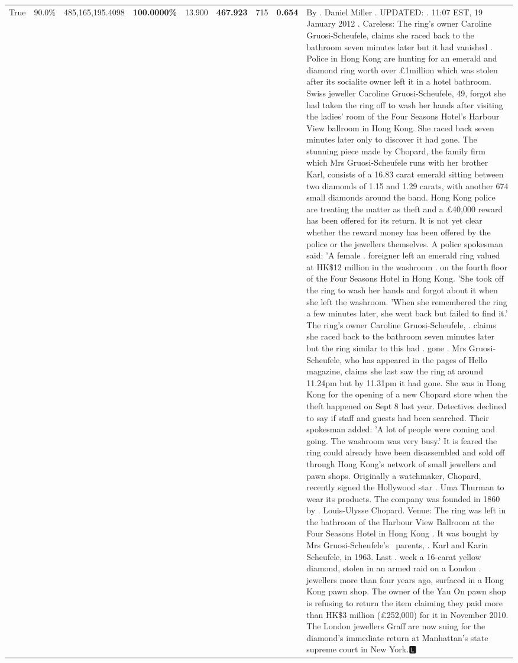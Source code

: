 \begin{table}[H]
\begin{tabular}{lllrlllll}
\cline{1-9}
True & 90.0\% & 485,165,195.4098 & \bfseries \color{red} 100.0000\% & 13.900 & \bfseries \color{red} 467.923 & 715 & \bfseries \color{red} 0.654 & By . Daniel Miller . UPDATED: . 11:07 EST, 19 January 2012 . Careless: The ring's owner Caroline Gruosi-Scheufele, claims she raced back to the bathroom seven minutes later but it had vanished . Police in Hong Kong are hunting for an emerald and diamond ring worth over £1million which was stolen after its socialite owner left it in a hotel bathroom. Swiss jeweller Caroline Gruosi-Scheufele, 49, forgot she had taken the ring off to wash her hands after visiting the ladies' room of the Four Seasons Hotel's Harbour View ballroom in Hong Kong. She raced back seven minutes later only to discover it had gone. The stunning piece made by Chopard, the family firm which Mrs Gruosi-Scheufele runs with her brother Karl, consists of a 16.83 carat emerald sitting between two diamonds of 1.15 and 1.29 carats, with another 674 small diamonds around the band. Hong Kong police are treating the matter as theft and a £40,000 reward has been offered for its return. It is not yet clear whether the reward money has been offered by the police or the jewellers themselves. A police spokesman said: 'A female . foreigner left an emerald ring valued at HK\$12 million in the washroom . on the fourth floor of the Four Seasons Hotel in Hong Kong. 'She took off the ring to wash her hands and forgot about it when she left the washroom. 'When she remembered the ring a few minutes later, she went back but failed to find it.' The ring's owner Caroline Gruosi-Scheufele, . claims she raced back to the bathroom seven minutes later but the ring similar to this had . gone . Mrs Gruosi-Scheufele, who has appeared in the pages of Hello magazine, claims she last saw the ring at around 11.24pm but by 11.31pm it had gone. She was in Hong Kong for the opening of a new Chopard store when the theft happened on Sept 8 last year. Detectives declined to say if staff and guests had been searched. Their spokesman added: 'A lot of people were coming and going. The washroom was very busy.' It is feared the ring could already have been disassembled and sold off through Hong Kong's network of small jewellers and pawn shops. Originally a watchmaker, Chopard, recently signed the Hollywood star . Uma Thurman to wear its products. The company was founded in 1860 by . Louis-Ulysse Chopard. Venue: The ring was left in the bathroom of the Harbour View Ballroom at the Four Seasons Hotel in Hong Kong . It was bought by Mrs Gruosi-Scheufele's  parents, . Karl and Karin Scheufele, in 1963. Last . week a 16-carat yellow diamond, stolen in an armed raid on a London . jewellers more than four years ago, surfaced in a Hong Kong pawn shop. The owner of the Yau On pawn shop is refusing to return the item claiming they paid more than HK\$3 million (£252,000) for it in November 2010. The London jewellers Graff are now suing for the diamond’s immediate return at Manhattan’s state supreme court in New York.🅻 \\

\end{tabular}
\end{table}
